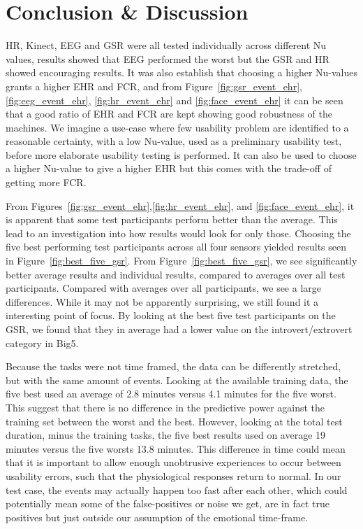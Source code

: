 \section{Conclusion \& Discussion}
HR, Kinect, EEG and GSR were all tested individually across different Nu values, results showed that EEG performed the worst but the GSR and HR showed encouraging results. It was also establish that choosing a higher Nu-values grants a higher EHR and FCR, and from Figure~\ref{fig:gsr_event_ehr}, \ref{fig:eeg_event_ehr}, \ref{fig:hr_event_ehr} and \ref{fig:face_event_ehr} it can be seen that a good ratio of EHR and FCR are kept showing good robustness of the machines.
We imagine a use-case where few usability problem are identified to a reasonable certainty, with a low Nu-value, used as
a preliminary usability test, before more elaborate usability testing is performed. It can also be used to choose a higher Nu-value to give a higher EHR but this comes with the trade-off of getting more FCR.

From  Figures~\ref{fig:gsr_event_ehr},\ref{fig:hr_event_ehr}, and \ref{fig:face_event_ehr}, it is apparent that
some test participants perform better than the average. This lead to an investigation into how results
would look for only those. Choosing the five best performing test participants across all four sensors yielded results
seen in Figure~\ref{fig:best_five_gsr}. From Figure~\ref{fig:best_five_gsr}, we see significantly better average results
and individual results, compared to averages over all test participants. Compared with averages over all participants,
we see a large differences. While it may not be apparently surprising, we still found it a interesting point of focus.
By looking at the best five test participants on the GSR, we found that they in average had a lower value on the introvert/extrovert category in Big5.

Because the tasks were not time framed, the data can be differently stretched, but with the same amount of
events. Looking at the available training data, the five best used an average of 2.8 minutes versus 4.1 minutes for the
five worst. This suggest that there is no difference in the predictive power against the training set between the worst
and the best. However, looking at the total test duration, minus the training tasks, the five best results used on
average 19 minutes versus the five worsts 13.8 minutes. This difference in time could mean that it is important to allow
enough unobtrusive experiences to occur between usability errors, such that the physiological responses return to
normal. In our test case, the events may actually happen too fast after each other, which could potentially mean some of
the false-positives or noise we get, are in fact true positives but just outside our assumption of the emotional
time-frame.

